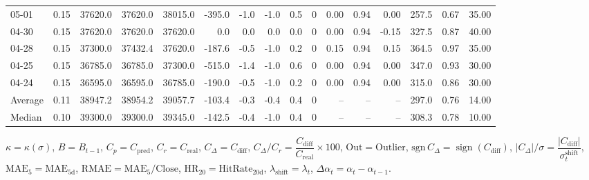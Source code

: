 \begin{threeparttable}
{\begin{tabular}{lrrrrrrrrrrrrrrr}
  05-01 &     0.15 & 37620.0 & 37620.0 & 38015.0 &     -395.0 &           -1.0 &                     -1.0 &                 0.5 &              0 &       0.00 &      0.94 &           0.00 &            257.5 &            0.67 &                  35.00 \\
  04-30 &     0.15 & 37620.0 & 37620.0 & 37620.0 &        0.0 &            0.0 &                      0.0 &                 0.0 &              0 &       0.00 &      0.94 &          -0.15 &            327.5 &            0.87 &                  40.00 \\
  04-28 &     0.15 & 37300.0 & 37432.4 & 37620.0 &     -187.6 &           -0.5 &                     -1.0 &                 0.2 &              0 &       0.15 &      0.94 &           0.15 &            364.5 &            0.97 &                  35.00 \\
  04-25 &     0.15 & 36785.0 & 36785.0 & 37300.0 &     -515.0 &           -1.4 &                     -1.0 &                 0.6 &              0 &       0.00 &      0.94 &           0.00 &            347.0 &            0.93 &                  30.00 \\
  04-24 &     0.15 & 36595.0 & 36595.0 & 36785.0 &     -190.0 &           -0.5 &                     -1.0 &                 0.2 &              0 &       0.00 &      0.94 &           0.00 &            315.0 &            0.86 &                  30.00 \\
Average &     0.11 & 38947.2 & 38954.2 & 39057.7 &     -103.4 &           -0.3 &                     -0.4 &                 0.4 &              0 &         -- &        -- &             -- &            297.0 &            0.76 &                  14.00 \\
 Median &     0.10 & 39300.0 & 39300.0 & 39345.0 &     -142.5 &           -0.4 &                     -1.0 &                 0.4 &              0 &         -- &        -- &             -- &            308.3 &            0.78 &                  10.00 \\
\bottomrule
\end{tabular}
}
\begin{tablenotes}\footnotesize
\item $\kappa=\kappa(\sigma)$, $B=B_{t-1}$, $C_p=C_{\text{pred}}$, $C_r=C_{\text{real}}$, $C_\Delta=C_{\text{diff}}$, $C_\Delta/C_r=\dfrac{C_{\text{diff}}}{C_{\text{real}}}\times100$, $\mathrm{Out}=\text{Outlier}$, $\mathrm{sgn}\,C_\Delta=\operatorname{sign}(C_{\text{diff}})$, $|C_\Delta|/\sigma=\dfrac{|C_{\text{diff}}|}{\sigma_t^{\text{shift}}}$, $\mathrm{MAE}_5=\mathrm{MAE}_{5\text{d}}$, $\mathrm{RMAE}= \mathrm{MAE}_5 / \text{Close}$, $\mathrm{HR}_{20}=\mathrm{HitRate}_{20\text{d}}$, 
$\lambda_{\text{shift}}=\lambda_t$, 
$\Delta\alpha_t=\alpha_t-\alpha_{t-1}$.
\end{tablenotes}
\end{threeparttable}
\endgroup

